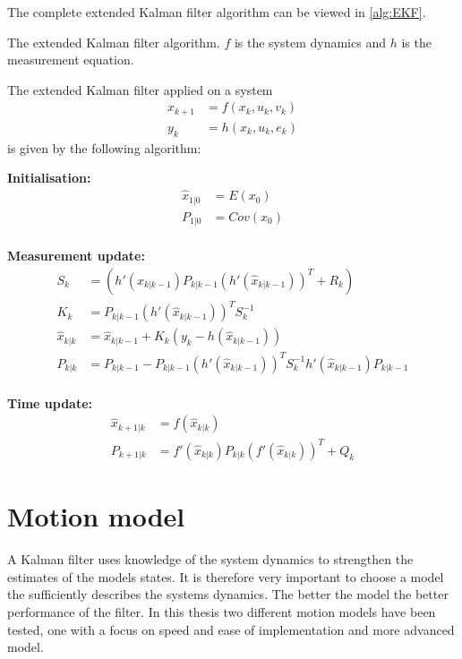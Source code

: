 The complete extended Kalman filter algorithm can be viewed in \ref{alg:EKF}.
\begin{algorithm}
\label{alg:EKF}
  \caption{The extended Kalman filter algorithm. $f$ is the system dynamics and $h$ is the measurement equation.}
  The extended Kalman filter applied on a system
    \begin{align*}
    x_{k+1} &= f(x_{k},u_{k},v_{k})\\
    y_{k} &= h(x_{k},u_{k},e_{k})
    \end{align*} is given by the following algorithm:
     
    \textbf{Initialisation:}
    \begin{align*}
    \hat{x}_{1|0} &= E(x_{0})\\
    P_{1|0} &= Cov(x_{0})\\
    \end{align*}
     
    \textbf{Measurement update:}
    \begin{align*}
    S_{k} &= (h'(\hat{x}_{k|k-1}) P_{k|k-1} (h'(\hat{x}_{k|k-1}))^{T} + R_{k})\\
    K_{k} &= P_{k|k-1}(h'(\hat{x}_{k|k-1}))^{T}S_{k}^{-1}\\
    \hat{x}_{k|k} &= \hat{x}_{k|k-1} + K_{k}(y_{k} - h(\hat{x}_{k|k-1}))\\
    P_{k|k} &= P_{k|k-1} - P_{k|k-1} (h'(\hat{x}_{k|k-1}))^{T}S_{k}^{-1}h'(\hat{x}_{k|k-1})P_{k|k-1}\\
    \end{align*}
    
   \textbf{Time update:}
    \begin{align*}
    \hat{x}_{k+1|k} &= f(\hat{x}_{k|k})\\
    P_{k+1|k} &= f'(\hat{x}_{k|k})P_{k|k}(f'(\hat{x}_{k|k}))^{T} + Q_{k}
    \end{align*}
\end{algorithm}

\section{Motion model}
A Kalman filter uses knowledge of the system dynamics to strengthen the estimates of the models states. It is therefore very important to choose a model the sufficiently describes the systems dynamics. The better the model the better performance of the filter. In this thesis two different motion models have been tested, one with a focus on speed and ease of implementation and more advanced model.

